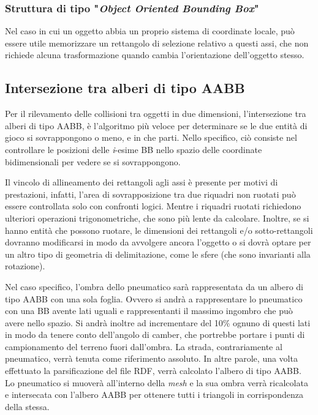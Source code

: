 \subsubsection{Struttura di tipo "\textit{Object Oriented Bounding Box}"}
Nel caso in cui un oggetto abbia un proprio sistema di coordinate locale, può essere utile memorizzare un rettangolo di selezione relativo a questi assi, che non richiede alcuna trasformazione quando cambia l'orientazione dell'oggetto stesso.

\subsection{Intersezione tra alberi di tipo AABB}
Per il rilevamento delle collisioni tra oggetti in due dimensioni, l'intersezione tra alberi di tipo \ac{AABB}, è l'algoritmo più veloce per determinare se le due entità di gioco si sovrappongono o meno, e in che parti. Nello specifico, ciò consiste nel controllare le posizioni delle \textit{i}-esime \ac{BB} nello spazio delle coordinate bidimensionali per vedere se si sovrappongono.

Il vincolo di allineamento dei rettangoli agli assi è presente per motivi di prestazioni, infatti, l'area di sovrapposizione tra due riquadri non ruotati può essere controllata solo con confronti logici. Mentre i riquadri ruotati richiedono ulteriori operazioni trigonometriche, che sono più lente da calcolare. Inoltre, se si hanno entità che possono ruotare, le dimensioni dei rettangoli e/o sotto-rettangoli dovranno modificarsi in modo da avvolgere ancora l'oggetto o si dovrà optare per un altro tipo di geometria di delimitazione, come le sfere (che sono invarianti alla rotazione).

Nel caso specifico, l'ombra dello pneumatico sarà rappresentata da un albero di tipo \ac{AABB} con una sola foglia. Ovvero si andrà a rappresentare lo pneumatico con una \ac{BB} avente lati uguali e rappresentanti il massimo ingombro che può avere nello spazio. Si andrà inoltre ad incrementare del 10\% ognuno di questi lati in modo da tenere conto dell'angolo di camber, che portrebbe portare i punti di campionamento del terreno fuori dall'ombra. La strada, contrariamente al pneumatico, verrà tenuta come riferimento assoluto. In altre parole, una volta effettuato la parsificazione del file \ac{RDF}, verrà calcolato l'albero di tipo \ac{AABB}. Lo pneumatico si muoverà all'interno della \textit{mesh} e la sua ombra verrà ricalcolata e intersecata con l'albero \ac{AABB} per ottenere tutti i triangoli in corrispondenza della stessa.

